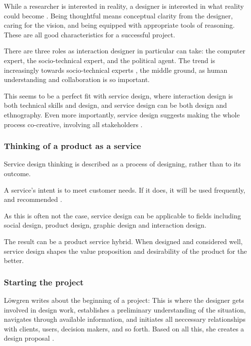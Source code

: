 While a researcher is interested in reality, a designer is interested in what reality could become \citep{lowgren}. Being thoughtful means conceptual clarity from the designer, caring for the vision, and being equipped with appropriate tools of reasoning. These are all good characteristics for a successful project.

There are three roles as interaction designer in particular can take: the computer expert, the socio-technical expert, and the political agent. The trend is increasingly towards socio-technical experts \citep{lowgren}, the middle ground, as human understanding and collaboration is so important.

This seems to be a perfect fit with service design, where interaction design is both technical skills and design, and service design can be both design and ethnography. Even more importantly, service design suggests making the whole process co-creative, involving all stakeholders \citep{stickdorn}.

\subsubsection{Thinking of a product as a service}

Service design thinking is described as a process of designing, rather than to its outcome.

A service's intent is to meet customer needs. If it does, it will be used frequently, and recommended \citep{stickdorn}.

As this is often not the case, service design can be applicable to fields including social design, product design, graphic design and interaction design.

The result can be a product service hybrid. When designed and considered well, service design shapes the value proposition and desirability of the product for the better.

\subsubsection{Starting the project}

Löwgren writes about the beginning of a project: This is where the designer gets involved in design work, establishes a preliminary understanding of the situation, navigates through available information, and initiates all neccessary relationships with clients, users, decision makers, and so forth. Based on all this, she creates a design proposal \citep{lowgren}.
